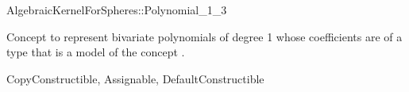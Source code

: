 \begin{ccRefConcept}{AlgebraicKernelForSpheres::Polynomial_1_3}

\ccDefinition

Concept to represent bivariate polynomials of degree 1 whose
coefficients are of a type that is a model of the concept
.

\ccRefines
CopyConstructible, Assignable, DefaultConstructible






\ccHasModels


\ccSeeAlso


\end{ccRefConcept}
